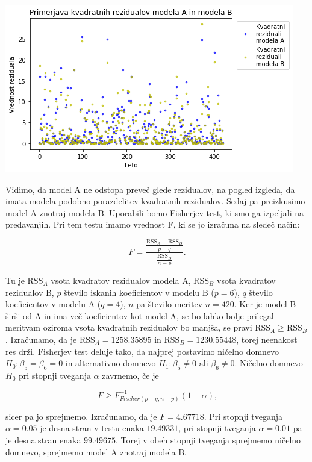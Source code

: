 \documentclass[12pt, a4paper]{article}
\begin{document}
\begin{center}
    \includegraphics[scale=0.7]{Naloga_3_11}
\end{center}

Vidimo, da model A ne odstopa preveč glede rezidualov, na pogled izgleda, da imata 
modela podobno porazdelitev kvadratnih rezidualov. 
Sedaj pa preizkusimo model A znotraj modela B. Uporabili bomo Fisherjev test, ki 
smo ga izpeljali na predavanjih. Pri tem testu imamo vrednost F, ki se jo izračuna 
na sledeč način: 

$$  F = \frac{\frac{\text{RSS}_A - \text{RSS}_B}{p-q}}{\frac{\text{RSS}_B}{n-p}} \text{.}
$$

Tu je $\text{RSS}_A$ vsota kvadratov rezidualov modela A, $\text{RSS}_B$ vsota 
kvadratov rezidualov B, $p$ število iskanih koeficientov v modelu B ($p=6$), 
$q$ število koeficientov v modelu A ($q=4$), $n$ pa število meritev $n=420$. 
Ker je model B širši od A in ima več koeficientov kot model A, se bo lahko bolje 
prilegal meritvam oziroma vsota kvadratnih rezidualov bo manjša, se pravi 
$\text{RSS}_A \geq \text{RSS}_B$. Izračunamo, da je $\text{RSS}_A = 1258.35895$ 
in $\text{RSS}_B = 1230.55448$, torej neenakost res drži. 
Fisherjev test deluje tako, da najprej postavimo ničelno domnevo $H_0 : \beta_5 = 
\beta_6 = 0$ in alternativno domnevo $H_1 : \beta_5 \neq 0 \text{ ali }\beta_6 
\neq 0$. Ničelno domnevo $H_0$ pri stopnji tveganja $\alpha$ zavrnemo, če je

$$ F \geq F^{-1}_{Fischer(p-q, n-p)}(1-\alpha) \text{,}
$$

sicer pa jo sprejmemo. Izračunamo, da je $F = 4.67718$. Pri stopnji tveganja 
$\alpha = 0.05$ je desna stran v testu enaka $19.49331$, pri stopnji tveganja 
$\alpha = 0.01$ pa je desna stran enaka $99.49675$. Torej v obeh stopnji tveganja 
sprejmemo ničelno domnevo, sprejmemo model A znotraj modela B.
\end{document}
